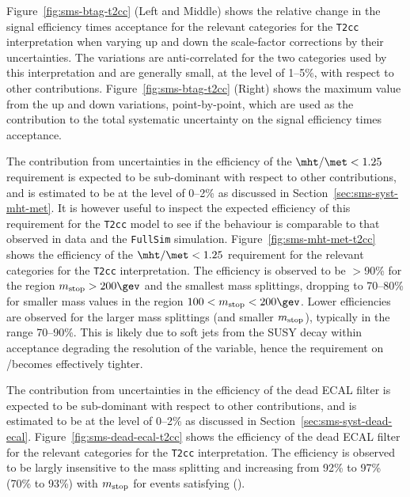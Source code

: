 Figure~\ref{fig:sms-btag-t2cc} (Left and Middle) shows the relative
change in the signal efficiency times acceptance for the relevant
categories for the \verb!T2cc! interpretation when varying up and down
the scale-factor corrections by their uncertainties. The variations
are anti-correlated for the two \nb categories used by this
interpretation and are generally small, at the level of 1--5\%, with
respect to other contributions.  Figure~\ref{fig:sms-btag-t2cc}
(Right) shows the maximum value from the up and down variations,
point-by-point, which are used as the contribution to the total
systematic uncertainty on the signal efficiency times acceptance.

The contribution from uncertainties in the efficiency of the
$\mht/\met < 1.25$ requirement is expected to be sub-dominant with
respect to other contributions, and is estimated to be at the level of
0--2\% as discussed in Section~\ref{sec:sms-syst-mht-met}. It is
however useful to inspect the expected efficiency of this requirement
for the \verb!T2cc! model to see if the behaviour is comparable to
that observed in data and the \verb!FullSim!
simulation. Figure~\ref{fig:sms-mht-met-t2cc} shows the efficiency of
the $\mht/\met < 1.25$ requirement for the relevant categories for the
\verb!T2cc! interpretation. The efficiency is observed to be $>$90\%
for the region $m_{\rm stop} > 200\gev$ and the smallest mass
splittings, dropping to 70--80\% for smaller mass values in the region
$100 < m_{\rm stop} < 200\gev$. Lower efficiencies are observed for
the larger mass splittings (and smaller $m_{\rm stop}$), typically in
the range 70--90\%. This is likely due to soft jets from the SUSY
decay within acceptance degrading the resolution of the \mht variable,
hence the requirement on \mht/\met becomes effectively tighter.

The contribution from uncertainties in the efficiency of the dead ECAL
filter is expected to be sub-dominant with respect to other
contributions, and is estimated to be at the level of 0--2\% as
discussed in Section~\ref{sec:sms-syst-dead-ecal}.
Figure~\ref{fig:sms-dead-ecal-t2cc} shows the efficiency of the dead
ECAL filter for the relevant categories for the \verb!T2cc!
interpretation. The efficiency is observed to be largly insensitive to
the mass splitting and increasing from 92\% to 97\% (70\% to 93\%)
with $m_{\rm stop}$ for events satisfying \njetlow (\njethigh).


